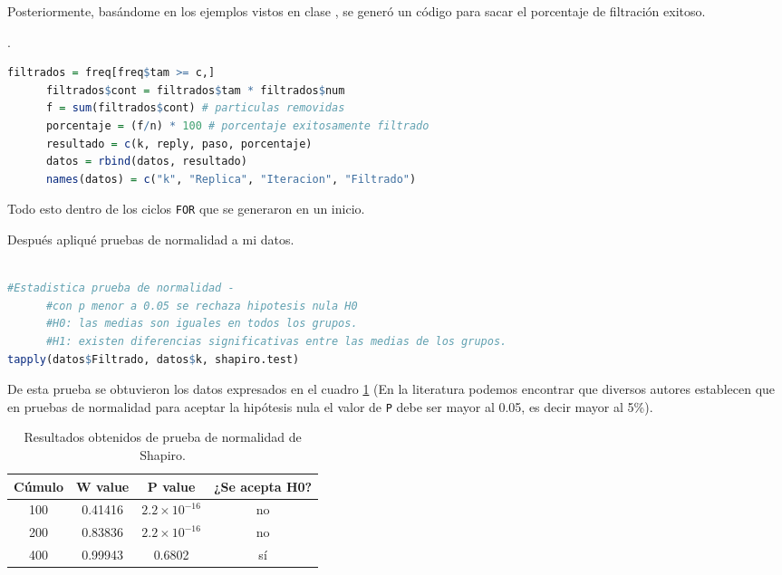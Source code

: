 \documentclass{article}
\begin{document}
Posteriormente, bas\'andome en los ejemplos vistos en clase \cite{fragmento}, se gener\'o un c\'odigo para sacar el porcentaje de filtraci\'on exitoso.

.
\begin{lstlisting}[language=R, caption= Segmento de c\'odigo para filtrado exitoso.]
filtrados = freq[freq$tam >= c,]
      filtrados$cont = filtrados$tam * filtrados$num
      f = sum(filtrados$cont) # particulas removidas
      porcentaje = (f/n) * 100 # porcentaje exitosamente filtrado
      resultado = c(k, reply, paso, porcentaje)
      datos = rbind(datos, resultado)
      names(datos) = c("k", "Replica", "Iteracion", "Filtrado")
\end{lstlisting}

Todo esto dentro de los ciclos \texttt{FOR} que se generaron en un inicio.


Despu\'es apliqu\'e pruebas de normalidad a mi datos.

\begin{lstlisting}[language=R, caption= Segmento de c\'odigo para prueba de normalidad Shapiro-Wilk.]

#Estadistica prueba de normalidad - 
      #con p menor a 0.05 se rechaza hipotesis nula H0
      #H0: las medias son iguales en todos los grupos.
      #H1: existen diferencias significativas entre las medias de los grupos.
tapply(datos$Filtrado, datos$k, shapiro.test)
\end{lstlisting}

De esta prueba se obtuvieron los datos expresados en el cuadro \ref{cuadro 1} (En la literatura podemos encontrar que diversos autores establecen que en pruebas de normalidad para aceptar la hip\'otesis nula el valor de \texttt{P} debe ser mayor al 0.05, es decir mayor al 5\%).

\begin{table}[ht]
    \centering
    \caption{Resultados obtenidos de prueba de normalidad de Shapiro.} 
    \begin{tabular}{|c|c|c|c|}
    \hline
    C\'umulo & W value & P value & ¿Se acepta H0?  \\
    \hline
    100 & 0.41416 & $2.2\times 10^{-16}$ & no \\
    \hline 
     200 & 0.83836 & $2.2\times 10^{-16}$ & no  \\
    \hline 
    400 & 0.99943 & 0.6802 & s\'i \\
    \hline 
\end{tabular}
    \label{cuadro 1}
\end{table}
\end{document}
